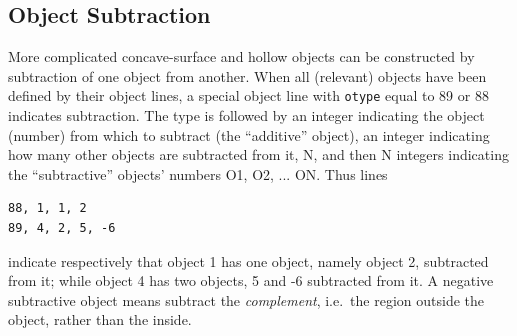 \documentclass[12pt]{article}
\begin{document}
\subsection{Object Subtraction}

More complicated concave-surface and hollow objects can be constructed
by subtraction of one object from another. When all (relevant) objects
have been defined by their object lines, a special object line with
\verb!otype! equal to 89 or 88 indicates subtraction. The type is
followed by an integer indicating the object (number) from which to
subtract (the ``additive'' object), an integer indicating how many
other objects are subtracted from it, N, and then N integers
indicating the ``subtractive'' objects' numbers O1, O2, ... ON. Thus lines
\begin{verbatim}
88, 1, 1, 2
89, 4, 2, 5, -6
\end{verbatim}
indicate respectively that object 1 has one object, namely object 2,
subtracted from it; while object 4 has two objects, 5 and -6
subtracted from it. A negative subtractive object means subtract the
\emph{complement}, i.e.\ the region outside the object, rather than
the inside.
\end{document}

